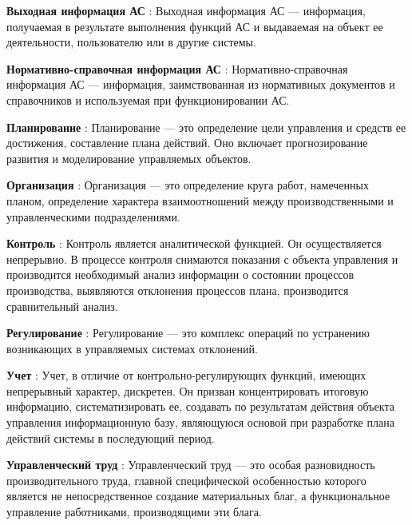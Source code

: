 \textbf{ Выходная информация АС } : Выходная информация АС — информация, получаемая в результате выполнения функций АС и выдаваемая на объект ее деятельности, пользователю или в другие системы.

\textbf{ Нормативно-справочная информация АС } : Нормативно-справочная информация АС — информация, заимствованная из нормативных документов и справочников и используемая при функционировании АС.

\textbf{ Планирование } : Планирование — это определение цели управления и средств ее достижения, составление плана действий. Оно включает прогнозирование развития и моделирование управляемых объектов.

\textbf{ Организация  } : Организация — это определение круга работ, намеченных планом, определение характера взаимоотношений между производственными и управленческими подразделениями.

\textbf{ Контроль  } : Контроль является аналитической функцией. Он осуществляется непрерывно. В процессе контроля снимаются показания с объекта управления и производится необходимый анализ информации о состоянии процессов производства, выявляются отклонения процессов плана, производится сравнительный анализ.

\textbf{ Регулирование  } : Регулирование — это комплекс операций по устранению возникающих в управляемых системах отклонений.

\textbf{  Учет  } : Учет, в отличие от контрольно-регулирующих функций, имеющих непрерывный характер, дискретен. Он призван концентрировать итоговую информацию, систематизировать ее, создавать по результатам действия объекта управления информационную базу, являющуюся основой при разработке плана действий системы в последующий период.

\textbf{ Управленческий труд } : Управленческий труд — это особая разновидность производительного труда, главной специфической особенностью которого является не непосредственное создание материальных благ, а функциональное управление работниками, производящими эти блага.
